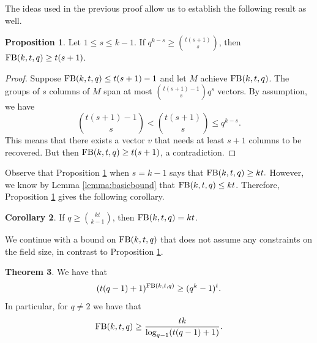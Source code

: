 \documentclass[11pt,a4paper]{article}
\theoremstyle{definition}
\newtheorem{theorem}{Theorem}[section]
\newtheorem{proposition}[theorem]{Proposition}
\newtheorem{corollary}[theorem]{Corollary}
\newcommand{\fb}{\textnormal{FB}}
\begin{document}
The ideas used in the previous proof
allow us to establish the following result as well.

\begin{proposition}
\label{prop:bounds_on_q}
Let $1 \le s \le k-1$. If $q^{k-s} \ge \binom{t(s+1)}{s}$, then $\fb(k,t,q) \ge t(s+1)$.    
\end{proposition}
    \begin{proof}
        Suppose $\fb(k,t,q) \le t(s+1)-1$ and let $M$ achieve $\fb(k,t,q)$. The groups of $s$ columns of $M$ span at most
        $\binom{t(s+1)-1}{s}q^s$ vectors. By assumption, we have
        $$\binom{t(s+1)-1}{s} < \binom{t(s+1)}{s} \le q^{k-s}.$$
        This means that there exists a vector $v$ that needs at least $s+1$ columns to be recovered. But then $\fb(k,t,q)\ge t(s+1)$, a contradiction.
    \end{proof}

Observe that Proposition \ref{prop:bounds_on_q} when $s=k-1$ says that $\fb(k,t,q) \ge kt.$ However, we know by Lemma \ref{lemma:basicbound} that $\fb(k,t,q) \le kt$. Therefore, Proposition \ref{prop:bounds_on_q} gives 
the following corollary.

\begin{corollary}\label{corollary:lowb}
If $q \ge \binom{kt}{k-1}$, then $\fb(k,t,q) = kt$.
\end{corollary}

We continue with a bound on $\fb(k,t,q)$ that does not assume any constraints on the field size, in contrast to Proposition \ref{prop:bounds_on_q}.

\begin{theorem}\label{theorem:majorbound}
 We have that
\begin{equation*}
    (t(q-1)+1)^{\fb(k,t,q)}\geq (q^k-1)^t.
\end{equation*}
In particular, for $q\neq 2$ we have that
\begin{equation*}
    \fb(k,t,q)\geq \frac{tk}{\log_{q-1}(t(q-1)+1)}.
\end{equation*}
\end{theorem}
\end{document}
